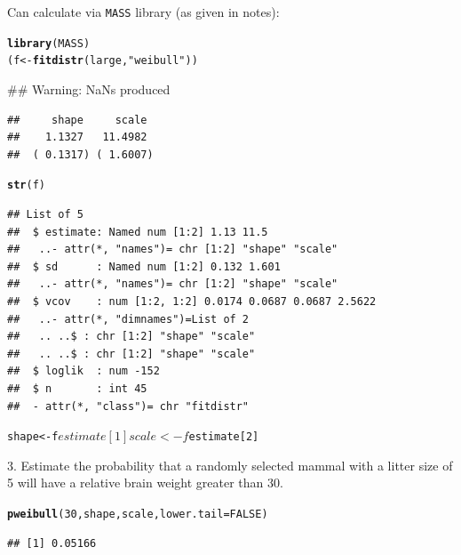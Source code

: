 \documentclass{article}\usepackage{graphicx, color}
\makeatletter
\newcommand{\hlfunctioncall}[1]{\textcolor[rgb]{0.501960784313725,0,0.329411764705882}{\textbf{#1}}}%
\newcommand{\hlstring}[1]{\textcolor[rgb]{0.6,0.6,1}{#1}}%
\newenvironment{kframe}{%
 \def\at@end@of@kframe{}%
 \ifinner\ifhmode%
  \def\at@end@of@kframe{\end{minipage}}%
  \begin{minipage}{\columnwidth}%
 \fi\fi%
 \def\FrameCommand##1{\hskip\@totalleftmargin \hskip-\fboxsep
 \colorbox{shadecolor}{##1}\hskip-\fboxsep
     \hskip-\linewidth \hskip-\@totalleftmargin \hskip\columnwidth}%
 \MakeFramed {\advance\hsize-\width
   \@totalleftmargin\z@ \linewidth\hsize
   \@setminipage}}%
 {\par\unskip\endMakeFramed%
 \at@end@of@kframe}
\newenvironment{knitrout}{}{} %
\makeatother
\begin{document}
\begin{shaded}
Can calculate via {\tt MASS} library (as given in notes):
\begin{knitrout}
\color{fgcolor}\begin{kframe}
\begin{alltt}
\hlfunctioncall{library}(MASS)
(f <- \hlfunctioncall{fitdistr}(large, \hlstring{"weibull"}))
\end{alltt}


{\ttfamily\noindent\textcolor{warningcolor}{\#\# Warning: NaNs produced}}\begin{verbatim}
##     shape     scale 
##    1.1327   11.4982 
##  ( 0.1317) ( 1.6007)
\end{verbatim}
\begin{alltt}
\hlfunctioncall{str}(f)
\end{alltt}
\begin{verbatim}
## List of 5
##  $ estimate: Named num [1:2] 1.13 11.5
##   ..- attr(*, "names")= chr [1:2] "shape" "scale"
##  $ sd      : Named num [1:2] 0.132 1.601
##   ..- attr(*, "names")= chr [1:2] "shape" "scale"
##  $ vcov    : num [1:2, 1:2] 0.0174 0.0687 0.0687 2.5622
##   ..- attr(*, "dimnames")=List of 2
##   .. ..$ : chr [1:2] "shape" "scale"
##   .. ..$ : chr [1:2] "shape" "scale"
##  $ loglik  : num -152
##  $ n       : int 45
##  - attr(*, "class")= chr "fitdistr"
\end{verbatim}
\begin{alltt}
shape <- f$estimate[1]
scale <- f$estimate[2]
\end{alltt}
\end{kframe}
\end{knitrout}




\end{shaded}
\item[3.] Estimate the probability that a randomly selected mammal with a litter size of 5 will have a relative brain weight  greater than 30.
\begin{shaded}
\begin{knitrout}
\color{fgcolor}\begin{kframe}
\begin{alltt}
\hlfunctioncall{pweibull}(30, shape, scale, lower.tail = FALSE)
\end{alltt}
\begin{verbatim}
## [1] 0.05166
\end{verbatim}
\end{kframe}
\end{knitrout}

\end{shaded}
\end{document}

